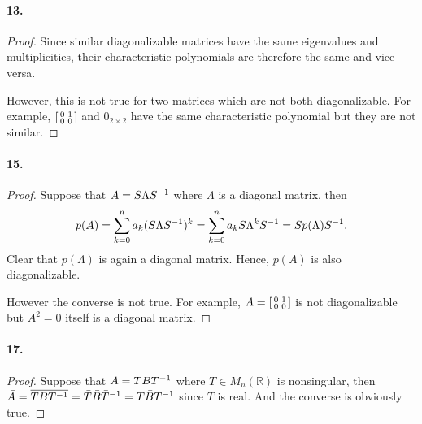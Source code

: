   \paragraph{13.}
  \begin{proof}
    Since similar diagonalizable matrices have the same eigenvalues and 
    multiplicities, their characteristic polynomials are therefore the same and
    vice versa.\par
    However, this is not true for two matrices which are not both 
    diagonalizable. For example, $\begin{bsmallmatrix} 0 & 1 \\ 0 & 0 
    \end{bsmallmatrix}$ and $0_{2\times 2}$ have the same characteristic 
    polynomial but they are not similar.
  \end{proof}

  \paragraph{15.}
  \begin{proof}
    Suppose that $A=S\Lambda S^{-1}$ where $\Lambda$ is a diagonal matrix, then
    \[
      p(A) = \sum_{k=0}^n a_k(S\Lambda S^{-1})^k = 
      \sum_{k=0}^n a_kS\Lambda^kS^{-1} = Sp(\Lambda)S^{-1}.
    \]
    Clear that $p(\Lambda)$ is again a diagonal matrix. Hence, $p(A)$ is also
    diagonalizable. \par
    However the converse is not true. For example, $A = \begin{bsmallmatrix} 
    0 & 1 \\ 0 & 0 \end{bsmallmatrix}$ is not diagonalizable but $A^2 = 0$ 
    itself is a diagonal matrix.
  \end{proof}

  \paragraph{17.}
  \begin{proof}
    Suppose that $A=TBT^{-1}$ where $T\in M_n(\mathbb{R})$ is nonsingular, then
    $\bar{A}=\overline{TBT^{-1}} = \bar{T}\bar{B}\bar{T}^{-1} = T\bar{B}T^{-1}$ 
    since $T$ is real. And the converse is obviously true.
  \end{proof}

